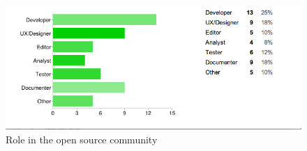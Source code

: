 \begin{figure}[ht!]
\centering
\includegraphics[width=130mm]{chapters/img/contribution_role.png}
\caption{Role in the open source community}
\label{fig:contribution_role}
\end{figure}

